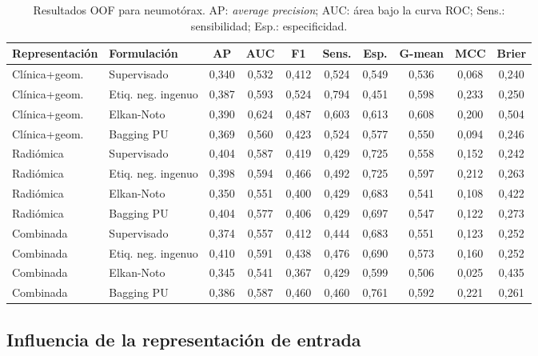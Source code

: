 \begin{table}[!htbp]
\centering
\caption{Resultados OOF para neumotórax. AP: \textit{average precision}; AUC: área bajo la curva ROC; Sens.: sensibilidad; Esp.: especificidad.}
\label{tab:pu_resultados_neumotorax}
\scriptsize
\begin{adjustbox}{max width=\textwidth}
\begin{tabular}{llcccccccc}
\toprule
\textbf{Representación} & \textbf{Formulación} & \textbf{AP} & \textbf{AUC} & \textbf{F1} & \textbf{Sens.} & \textbf{Esp.} & \textbf{G-mean} & \textbf{MCC} & \textbf{Brier} \\
\midrule
Clínica+geom. & Supervisado & 0,340 & 0,532 & 0,412 & 0,524 & 0,549 & 0,536 & 0,068 & 0,240 \\
Clínica+geom. & Etiq. neg. ingenuo & 0,387 & 0,593 & 0,524 & 0,794 & 0,451 & 0,598 & 0,233 & 0,250 \\
Clínica+geom. & Elkan-Noto & 0,390 & 0,624 & 0,487 & 0,603 & 0,613 & 0,608 & 0,200 & 0,504 \\
Clínica+geom. & Bagging PU & 0,369 & 0,560 & 0,423 & 0,524 & 0,577 & 0,550 & 0,094 & 0,246 \\
\midrule
Radiómica & Supervisado & 0,404 & 0,587 & 0,419 & 0,429 & 0,725 & 0,558 & 0,152 & 0,242 \\
Radiómica & Etiq. neg. ingenuo & 0,398 & 0,594 & 0,466 & 0,492 & 0,725 & 0,597 & 0,212 & 0,263 \\
Radiómica & Elkan-Noto & 0,350 & 0,551 & 0,400 & 0,429 & 0,683 & 0,541 & 0,108 & 0,422 \\
Radiómica & Bagging PU & 0,404 & 0,577 & 0,406 & 0,429 & 0,697 & 0,547 & 0,122 & 0,273 \\
\midrule
Combinada & Supervisado & 0,374 & 0,557 & 0,412 & 0,444 & 0,683 & 0,551 & 0,123 & 0,252 \\
Combinada & Etiq. neg. ingenuo & 0,410 & 0,591 & 0,438 & 0,476 & 0,690 & 0,573 & 0,160 & 0,252 \\
Combinada & Elkan-Noto & 0,345 & 0,541 & 0,367 & 0,429 & 0,599 & 0,506 & 0,025 & 0,435 \\
Combinada & Bagging PU & 0,386 & 0,587 & 0,460 & 0,460 & 0,761 & 0,592 & 0,221 & 0,261 \\
\bottomrule
\end{tabular}
\end{adjustbox}
\end{table}

\subsection{Influencia de la representación de entrada}


